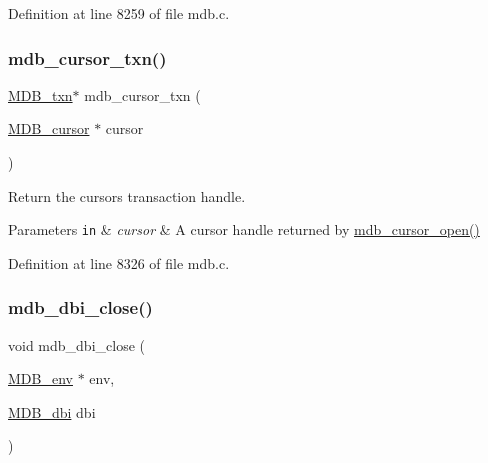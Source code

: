 Definition at line 8259 of file mdb.\+c.

\mbox{\label{group__mdb_ga7bf0d458f7f36b5232fcb368ebda79e0}} 
\subsubsection{\texorpdfstring{mdb\+\_\+cursor\+\_\+txn()}{mdb\_cursor\_txn()}}
{\footnotesize\ttfamily \mbox{\hyperlink{struct_m_d_b__txn}{M\+D\+B\+\_\+txn}}$\ast$ mdb\+\_\+cursor\+\_\+txn (\begin{DoxyParamCaption}\item[{\mbox{\hyperlink{struct_m_d_b__cursor}{M\+D\+B\+\_\+cursor}} $\ast$}]{cursor }\end{DoxyParamCaption})}



Return the cursor\textquotesingle{}s transaction handle. 


\begin{DoxyParams}[1]{Parameters}
\mbox{\tt in}  & {\em cursor} & A cursor handle returned by \mbox{\hyperlink{group__mdb_ga9ff5d7bd42557fd5ee235dc1d62613aa}{mdb\+\_\+cursor\+\_\+open()}} \\
\hline
\end{DoxyParams}


Definition at line 8326 of file mdb.\+c.

\mbox{\label{group__mdb_ga52dd98d0c542378370cd6b712ff961b5}} 
\subsubsection{\texorpdfstring{mdb\+\_\+dbi\+\_\+close()}{mdb\_dbi\_close()}}
{\footnotesize\ttfamily void mdb\+\_\+dbi\+\_\+close (\begin{DoxyParamCaption}\item[{\mbox{\hyperlink{struct_m_d_b__env}{M\+D\+B\+\_\+env}} $\ast$}]{env,  }\item[{\mbox{\hyperlink{group__mdb_gadbe68a06c448dfb62da16443d251a78b}{M\+D\+B\+\_\+dbi}}}]{dbi }\end{DoxyParamCaption})}



